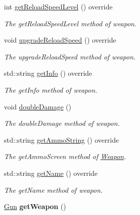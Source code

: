 \begin{DoxyCompactItemize}
int \hyperlink{class_gun_aa4625cb9f717925e0416d38ae02db057}{get\+Reload\+Speed\+Level} () override
\begin{DoxyCompactList}\small\item\em The get\+Reload\+Speed\+Level method of weapon. \end{DoxyCompactList}\item 
void \hyperlink{class_gun_a88408d572350474609c2fc294a6b807b}{upgrade\+Reload\+Speed} () override
\begin{DoxyCompactList}\small\item\em The upgrade\+Reload\+Speed method of weapon. \end{DoxyCompactList}\item 
std\+::string \hyperlink{class_gun_a95d46c82be65c2552f3386f561e53bfb}{get\+Info} () override
\begin{DoxyCompactList}\small\item\em The get\+Info method of weapon. \end{DoxyCompactList}\item 
void \hyperlink{class_gun_a62ab15432407b2396c86d35264ea8a5b}{double\+Damage} ()
\begin{DoxyCompactList}\small\item\em The double\+Damage method of weapon. \end{DoxyCompactList}\item 
std\+::string \hyperlink{class_gun_a6c38ebbaf4b538bda73538c4125c663c}{get\+Ammo\+String} () override
\begin{DoxyCompactList}\small\item\em The get\+Ammo\+Screen method of \hyperlink{class_weapon}{Weapon}. \end{DoxyCompactList}\item 
std\+::string \hyperlink{class_gun_a7230d075015f04e59822b9078719c5d7}{get\+Name} () override
\begin{DoxyCompactList}\small\item\em The get\+Name method of weapon. \end{DoxyCompactList}\item 
\hypertarget{class_gun_a86d8b628b6ea7038834ce538bea5cf9b}{\hyperlink{class_gun}{Gun} {\bfseries get\+Weapon} ()}\label{class_gun_a86d8b628b6ea7038834ce538bea5cf9b}


\end{DoxyCompactItemize}
